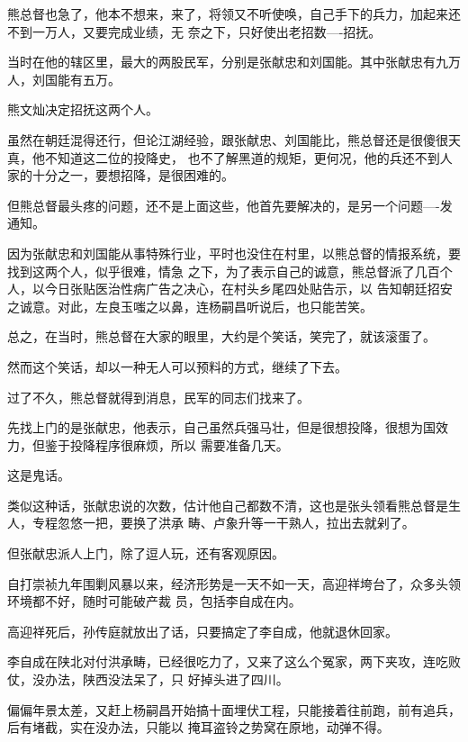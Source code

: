 \documentclass[11pt,a4paper,onecolumn]{article}
\begin{document}
熊总督也急了，他本不想来，来了，将领又不听使唤，自己手下的兵力，加起来还不到一万人，又要完成业绩，无
奈之下，只好使出老招数----招抚。

当时在他的辖区里，最大的两股民军，分别是张献忠和刘国能。其中张献忠有九万人，刘国能有五万。

熊文灿决定招抚这两个人。

虽然在朝廷混得还行，但论江湖经验，跟张献忠、刘国能比，熊总督还是很傻很天真，他不知道这二位的投降史，
也不了解黑道的规矩，更何况，他的兵还不到人家的十分之一，要想招降，是很困难的。

但熊总督最头疼的问题，还不是上面这些，他首先要解决的，是另一个问题----发通知。

因为张献忠和刘国能从事特殊行业，平时也没住在村里，以熊总督的情报系统，要找到这两个人，似乎很难，情急
之下，为了表示自己的诚意，熊总督派了几百个人，以今日张贴医治性病广告之决心，在村头乡尾四处贴告示，以
告知朝廷招安之诚意。对此，左良玉嗤之以鼻，连杨嗣昌听说后，也只能苦笑。

总之，在当时，熊总督在大家的眼里，大约是个笑话，笑完了，就该滚蛋了。

然而这个笑话，却以一种无人可以预料的方式，继续了下去。

过了不久，熊总督就得到消息，民军的同志们找来了。

先找上门的是张献忠，他表示，自己虽然兵强马壮，但是很想投降，很想为国效力，但鉴于投降程序很麻烦，所以
需要准备几天。

这是鬼话。

类似这种话，张献忠说的次数，估计他自己都数不清，这也是张头领看熊总督是生人，专程忽悠一把，要换了洪承
畴、卢象升等一干熟人，拉出去就剁了。

但张献忠派人上门，除了逗人玩，还有客观原因。

自打崇祯九年围剿风暴以来，经济形势是一天不如一天，高迎祥垮台了，众多头领环境都不好，随时可能破产裁
员，包括李自成在内。

高迎祥死后，孙传庭就放出了话，只要搞定了李自成，他就退休回家。

李自成在陕北对付洪承畴，已经很吃力了，又来了这么个冤家，两下夹攻，连吃败仗，没办法，陕西没法呆了，只
好掉头进了四川。

偏偏年景太差，又赶上杨嗣昌开始搞十面埋伏工程，只能接着往前跑，前有追兵，后有堵截，实在没办法，只能以
掩耳盗铃之势窝在原地，动弹不得。

\section[\thesection]{}
\end{document}
